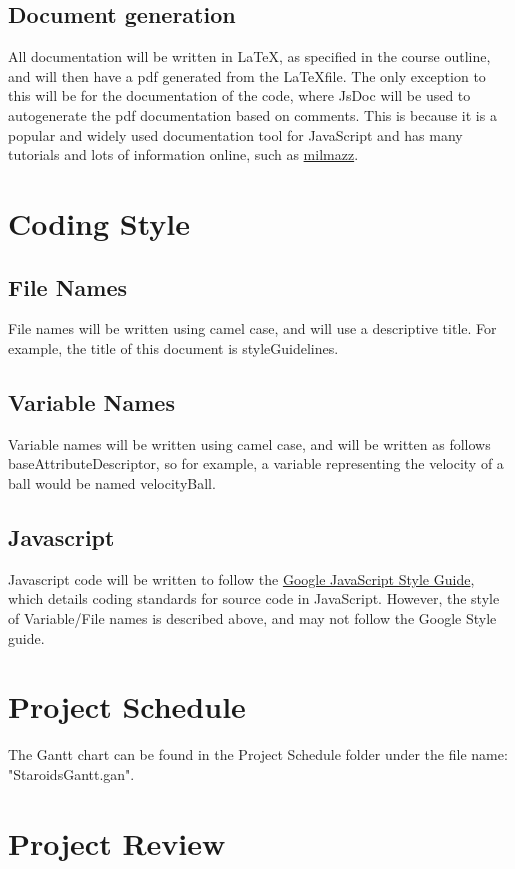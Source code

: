 \documentclass{article}
\begin{document}
\subsection{Document generation}
All documentation will be written in \LaTeX, as specified in the course outline, and will then have a pdf generated from the \LaTeX file. The only exception to this will be for the documentation of the code, where JsDoc will be used to autogenerate the pdf documentation based on comments. This is because it is a popular and widely used documentation tool for JavaScript and has many tutorials and lots of information online, such as \href{https://milmazz.uno/article/2014/08/27/how-to-document-your-javascript-code/}{milmazz}.

\section{Coding Style}
\subsection{File Names}
File names will be written using camel case, and will use a descriptive title. For example, the title of this document is styleGuidelines.
\subsection{Variable Names}
Variable names will be written using camel case, and will be written as follows baseAttributeDescriptor, so for example, a variable representing the velocity of a ball would be named velocityBall.
\subsection{Javascript}
Javascript code will be written to follow the \href{https://google.github.io/styleguide/jsguide.html}{Google JavaScript Style Guide}, which details coding standards for source code in JavaScript. However, the style of Variable/File names is described above, and may not follow the Google Style guide.

\section{Project Schedule}
The Gantt chart can be found in the Project Schedule folder under the file name: "StaroidsGantt.gan".

\section{Project Review}




\end{document}
